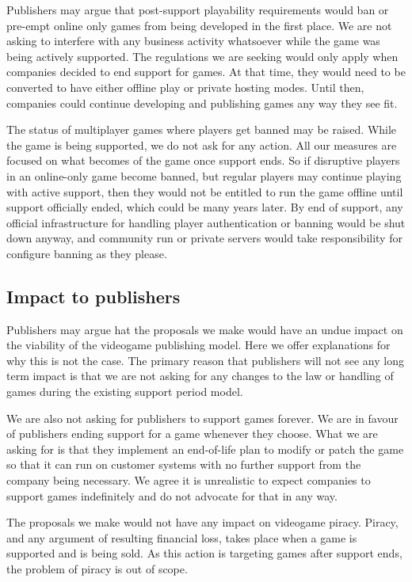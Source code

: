 Publishers may argue that post-support playability requirements would ban or pre-empt online only games from being developed in the first place.
We are not asking to interfere with any business activity whatsoever while the game was being actively supported.
The regulations we are seeking would only apply when companies decided to end support for games.
At that time, they would need to be converted to have either offline play or private hosting modes.
Until then, companies could continue developing and publishing games any way they see fit.

The status of multiplayer games where players get banned may be raised.
While the game is being supported, we do not ask for any action.
All our measures are focused on what becomes of the game once support ends.
So if disruptive players in an online-only game become banned, but regular players may continue playing with active support,
then they would not be entitled to run the game offline until support officially ended, which could be many years later\cn.
By end of support, any official infrastructure for handling player authentication or banning would be shut down anyway,
and community run or private servers would take responsibility for configure banning as they please.

\subsection{Impact to publishers}
Publishers may argue hat the proposals we make would have an undue impact on the viability of the videogame publishing model.
Here we offer explanations for why this is not the case.
The primary reason that publishers will not see any long term impact is that we are not asking for any changes to the law or handling of games during the existing support period model.

We are also not asking for publishers to support games forever.
We are in favour of publishers ending support for a game whenever they choose.
What we are asking for is that they implement an end-of-life plan to modify or patch the game
so that it can run on customer systems with no further support from the company being necessary.
We agree it is unrealistic to expect companies to support games indefinitely and do not advocate for that in any way.

The proposals we make would not have any impact on videogame piracy.
Piracy, and any argument of resulting financial loss, takes place when a game is supported and is being sold\cn.
As this action is targeting games after support ends, the problem of piracy is out of scope.


